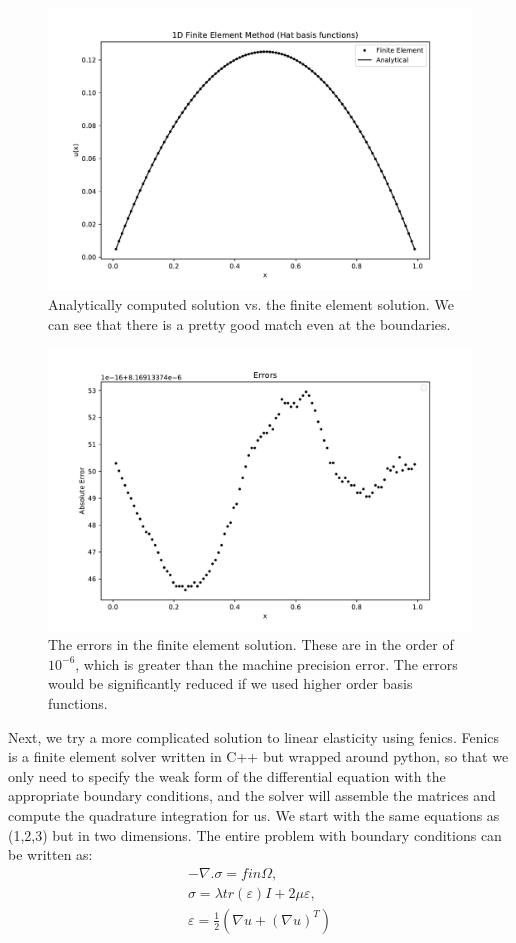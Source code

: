 \documentclass{article}
\begin{document}
\begin{figure}[!htb]
    \centering
    \includegraphics[scale=0.45]{fe_sol.pdf}
    \caption{Analytically computed solution vs. the finite element solution. We can see that there is a pretty good match even at the boundaries.}
\end{figure}
\begin{figure}[!htb]
    \centering
    \includegraphics[scale=0.45]{fe_err.pdf}
    \caption{The errors in the finite element solution. These are in the order of $10^{-6}$, which is greater than the machine precision error. The errors would be significantly reduced if we used higher order basis functions.}
\end{figure}

Next, we try a more complicated solution to linear elasticity using fenics. Fenics is a finite element solver written in C++ but wrapped around python, so that we only need to specify the weak form of the differential equation with the appropriate boundary conditions, and the solver will assemble the matrices and compute the quadrature integration for us. We start with the same equations as (1,2,3) but in two dimensions. The entire problem with boundary conditions can be written as:
\begin{align}
    -\nabla.\sigma = f in \Omega, \\
    \sigma = \lambda tr(\varepsilon)I + 2\mu\varepsilon, \\
    \varepsilon = \frac{1}{2}(\nabla u + (\nabla u)^T)
\end{align}
\end{document}
